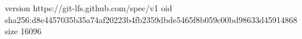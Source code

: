 version https://git-lfs.github.com/spec/v1
oid sha256:d8e4457035b35a74af20223b4fb2359dbde5465f8b059c00bd98633d45914868
size 16096
